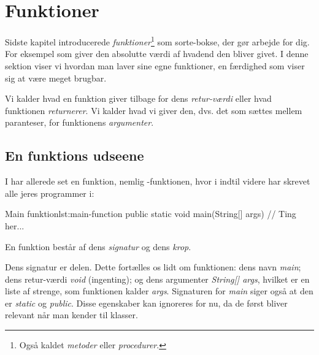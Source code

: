 

\section{Funktioner}

	Sidste kapitel introducerede \emph{funktioner}\footnote{Også kaldet \emph{metoder} eller \emph{procedurer}.}
	som sorte-bokse, der gør arbejde for dig. For eksempel 
	som giver den absolutte værdi af hvadend den bliver givet. I denne sektion
	viser vi hvordan man laver sine egne funktioner, en færdighed som viser
	sig at være meget brugbar.

    Vi kalder hvad en funktion giver tilbage for dens
    \emph{retur-værdi} eller hvad funktionen \emph{returnerer}. Vi
    kalder hvad vi giver den, dvs. det som sættes mellem paranteser,
    for funktionens \emph{argumenter}.




	\subsection{En funktions udseene}

		I har allerede set en funktion, nemlig -funktionen, hvor i
		indtil videre har skrevet alle jeres programmer i:

		\begin{JavaCode}{Main funktion}{lst:main-function}
			public static void main(String[] args) {
				// Ting her...
			}
		\end{JavaCode}

		En funktion består af dens \emph{signatur} og dens \emph{krop}.

        Dens signatur er 
        delen.  Dette fortælles os lidt om funktionen: dens
        navn \emph{main}; dens retur-værdi \emph{void} (ingenting); og
        dens argumenter \emph{String[] args}, hvilket er en liste af
        strenge, som funktionen kalder \emph{args}.  Signaturen for
        \emph{main} siger også at den er \emph{static} og
        \emph{public}. Disse egenskaber kan ignoreres for nu, da de
        først bliver relevant når man kender til klasser.

